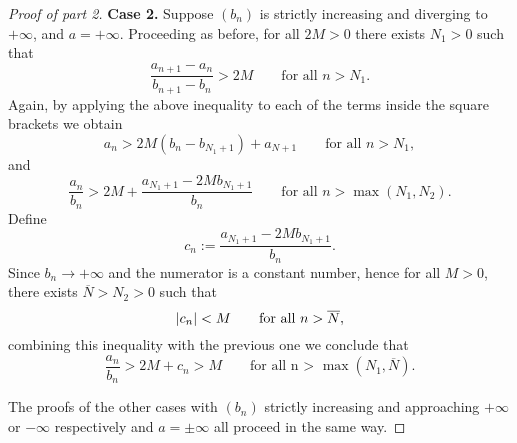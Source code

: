 \begin{proof}[Proof of part 2]
  \textbf{Case 2.} Suppose $(b_n)$ is strictly increasing and
  diverging to $+\infty$, and $a = +\infty$. Proceeding as before,
  for all $2M > 0$ there exists $N_1 > 0$ such that
  \[ \frac{a_{n + 1} - a_n}{b_{n + 1} - b_n} > 2M \qquad \text{for
  all $n > N_1$}. \]
  Again, by applying the above inequality to each of the terms inside
  the square brackets we obtain
  \[ a_n > 2M (b_n - b_{N_1 + 1}) + a_{N + 1} \qquad \text{for all $n
  > N_1$}, \]
  and
  \[ \frac{a_n}{b_n} > 2M + \frac{a_{N_1 + 1} - 2M b_{N_1 + 1}}{b_n}
  \qquad \text{for all $n > \max(N_1, N_2)$}. \]
  Define
  \[ c_n := \frac{a_{N_1 + 1} - 2M b_{N_1 + 1}}{b_n}. \]
  Since $b_n \to +\infty$ and the numerator is a constant number,
  hence for all $M > 0$, there exists $\overline{N} > N_2 > 0$ such that
  \[ | c_n | < M \qquad \text{for all $n > \overline{N}$}, \]
  combining this inequality with the previous one we conclude that
  \[ \frac{a_n}{b_n} > 2M + c_n > M \qquad \text{for all n >
  $\max(N_1, \overline{N})$}. \]

  The proofs of the other cases with $(b_n)$ strictly increasing and
  approaching $+\infty$ or $-\infty$ respectively and $a = \pm\infty$
  all proceed in the same way.
\end{proof}

